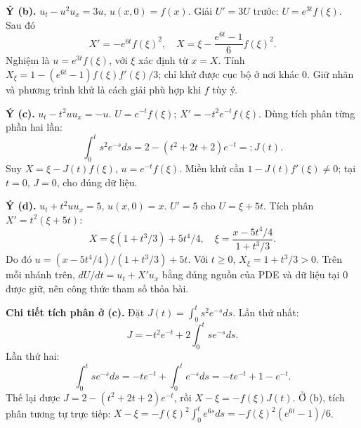 \documentclass[10pt,a4paper]{article}
\begin{document}
\textbf{Ý (b).} $u_t-u^2u_x=3u$, $u(x,0)=f(x)$. Giải $U'=3U$ trước: $U=e^{3t}f(\xi)$. Sau đó
\[X'= -e^{6t}f(\xi)^2,\quad X=\xi-\frac{e^{6t}-1}{6}f(\xi)^2.\]
Nghiệm là $u=e^{3t}f(\xi)$, với $\xi$ xác định từ $x=X$. Tính $X_\xi=1-(e^{6t}-1)f(\xi)f'(\xi)/3$; chỉ khử được cục bộ ở nơi khác 0. Giữ nhãn và phương trình khử là cách giải phù hợp khi $f$ tùy ý.

\textbf{Ý (c).} $u_t-t^2uu_x=-u$. $U=e^{-t}f(\xi)$; $X'= -t^2e^{-t}f(\xi)$. Dùng tích phân từng phần hai lần:
\[\int_0^t s^2e^{-s}ds=2-(t^2+2t+2)e^{-t}=:J(t).\]
Suy $X=\xi-J(t)f(\xi)$, $u=e^{-t}f(\xi)$. Miền khử cần $1-J(t)f'(\xi)\ne0$; tại $t=0$, $J=0$, cho đúng dữ liệu.

\textbf{Ý (d).} $u_t+t^2uu_x=5$, $u(x,0)=x$. $U'=5$ cho $U=\xi+5t$. Tích phân $X'=t^2(\xi+5t)$:
\[X=\xi(1+t^3/3)+5t^4/4,\quad \xi=\frac{x-5t^4/4}{1+t^3/3}.\]
Do đó $u=(x-5t^4/4)/(1+t^3/3)+5t$. Với $t\ge0$, $X_\xi=1+t^3/3>0$. Trên mỗi nhánh trên, $dU/dt=u_t+X'u_x$ bằng đúng nguồn của PDE và dữ liệu tại 0 được giữ, nên công thức tham số thỏa bài.

\textbf{Chi tiết tích phân ở (c).} Đặt $J(t)=\int_0^t s^2e^{-s}ds$. Lần thứ nhất:
\[J=-t^2e^{-t}+2\int_0^t se^{-s}ds.\]
Lần thứ hai:
\[\int_0^t se^{-s}ds=-te^{-t}+\int_0^t e^{-s}ds=-te^{-t}+1-e^{-t}.\]
Thế lại được $J=2-(t^2+2t+2)e^{-t}$, rồi $X-\xi=-f(\xi)J(t)$. Ở (b), tích phân tương tự trực tiếp: $X-\xi=-f(\xi)^2\int_0^te^{6s}ds=-f(\xi)^2(e^{6t}-1)/6$.
\end{document}

